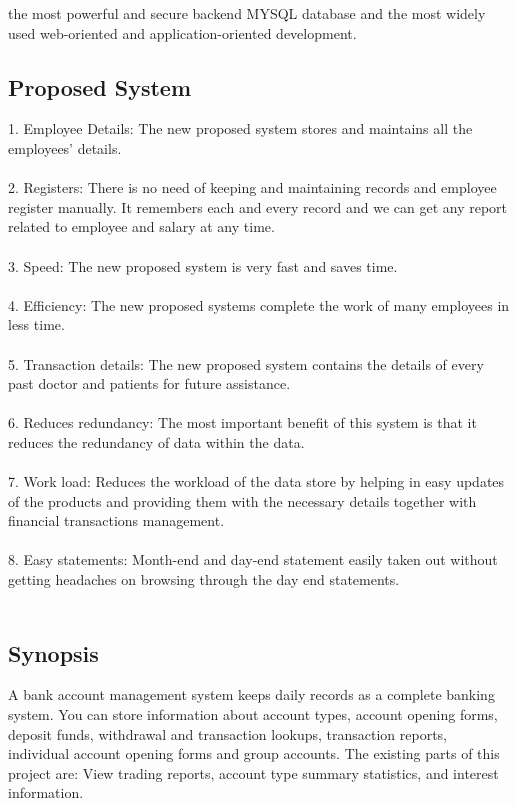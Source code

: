 \documentclass{article}
\begin{document}
the most powerful and secure backend MYSQL database and the most widely used web-oriented and application-oriented development.
\newpage
\subsection{Proposed System}
1.	Employee Details: The new proposed system stores and maintains all the employees’ details.
\\\\
2.	Registers: There is no need of keeping and maintaining records and employee register manually. It remembers each and every record and we can get any report related to employee and salary at any time.\\\\
3.	Speed: The new proposed system is very fast and saves time.
\\\\
4.	Efficiency: The new proposed systems complete the work of many employees in less time.
\\\\
5.	Transaction details: The new proposed system contains the details of every past doctor and patients for future assistance.
\\\\
6.	Reduces redundancy: The most important benefit of this system is that it reduces the redundancy of data within the data.
\\\\
7.	Work load: Reduces the workload of the data store by helping in easy updates of the products and providing them with the necessary details together with financial transactions management.
\\\\
8.	Easy statements: Month-end and day-end statement easily taken out without getting headaches on browsing through the day end statements.
\\\\
\newpage
\subsection{Synopsis }
A bank account management system keeps daily records as a complete banking system. You can store information about account types, account opening forms, deposit funds, withdrawal and transaction lookups, transaction reports, individual account opening forms and group accounts. The existing parts of this project are: View trading reports, account type summary statistics, and interest information.
\newpage
\end{document}
